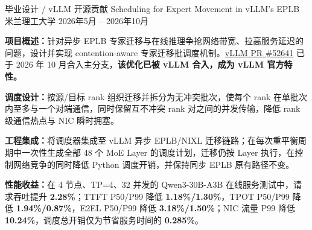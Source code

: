 

\begin{cventries}

  \cventry
    {\textcolor{awesome-red}{毕业设计 / vLLM 开源贡献}}
    {Scheduling for Expert Movement in vLLM's EPLB}
    {米兰理工大学}
    {2026年5月 -- 2026年10月}
    {
      \begin{cvitems}
        \item {\textbf{项目概述：}针对异步 EPLB 专家迁移与在线推理争抢网络带宽、拉高服务延迟的问题，设计并实现 contention-aware 专家迁移批调度机制。\href{https://github.com/vllm-project/vllm/pull/52641}{vLLM PR \#52641} 已于 2026 年 10 月合入主分支，\textbf{\textcolor{awesome-red}{该优化已被 vLLM 合入，成为 vLLM 官方特性。}}}
        \item {\textbf{调度设计：}按源/目标 rank 组织迁移并拆分为无冲突批次，使每个 rank 在单批次内至多与一个对端通信，同时保留互不冲突 rank 对之间的并发传输，降低 rank 级通信热点与 NIC 瞬时拥塞。}
        \item {\textbf{工程集成：}将调度器集成至 vLLM 异步 EPLB/NIXL 迁移链路；在每次重平衡周期中一次性生成全部 48 个 MoE Layer 的调度计划，迁移仍按 Layer 执行，在控制网络竞争的同时降低 Python 调度开销，并保持同步 EPLB 原有路径不变。}
        \item {\textbf{性能收益：}在 4 节点、TP=4、32 并发的 Qwen3-30B-A3B 在线服务测试中，请求吞吐提升 \textbf{2.28\%}；TTFT P50/P99 降低 \textbf{1.18\%/1.30\%}，TPOT P50/P99 降低 \textbf{1.94\%/0.87\%}，E2EL P50/P99 降低 \textbf{3.18\%/1.50\%}；NIC 流量 P99 降低 \textbf{10.24\%}，调度总开销仅为节省服务时间的 \textbf{0.285\%}。}
      \end{cvitems}
    }

\end{cventries}
